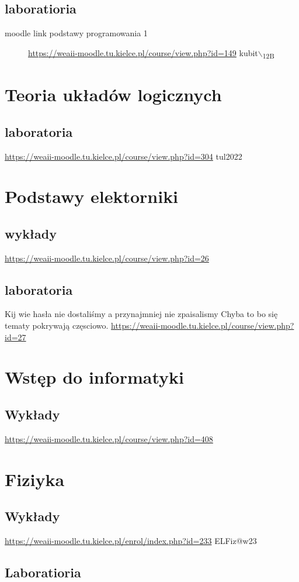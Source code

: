 \documentclass[11pt]{article}
\begin{document}
\subsection{laboratioria}
\label{sec:orgfec1672}
\begin{description}
\item[{moodle link podstawy programowania 1}] \url{https://weaii-moodle.tu.kielce.pl/course/view.php?id=149} kubit$\backslash$\textsubscript{12B}
\end{description}
\section{Teoria układów logicznych}
\label{sec:org248686d}
\subsection{laboratoria}
\label{sec:org4140ddc}
\url{https://weaii-moodle.tu.kielce.pl/course/view.php?id=304} tul2022
\section{Podstawy elektorniki}
\label{sec:org1b7da8e}
\subsection{wykłady}
\label{sec:org8fdc92f}
\url{https://weaii-moodle.tu.kielce.pl/course/view.php?id=26}
\subsection{laboratoria}
\label{sec:orgf99f5b7}
Kij wie hasła nie dostaliśmy a przynajmniej nie zpaisalismy
Chyba to bo się tematy pokrywają częsciowo.
\url{https://weaii-moodle.tu.kielce.pl/course/view.php?id=27}
\section{Wstęp do informatyki}
\label{sec:org0879023}
\subsection{Wykłady}
\label{sec:org73b7626}
\url{https://weaii-moodle.tu.kielce.pl/course/view.php?id=408}
\section{Fiziyka}
\label{sec:org728df7d}
\subsection{Wykłady}
\label{sec:orgddbc58a}
\url{https://weaii-moodle.tu.kielce.pl/enrol/index.php?id=233} ELFiz@w23
\subsection{Laboratioria}
\label{sec:orgba45381}
\end{document}
